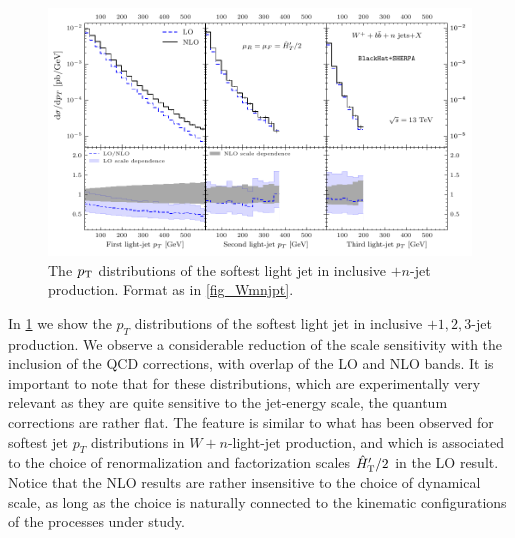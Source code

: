 \begin{figure}[ht]
  \centering
  \includegraphics[clip,scale=1]{plots/softestpt}
  \caption{The $p_{\textrm T}$
    distributions of the softest light jet in inclusive \Wbbp$+n$-jet production.
    Format as in \cref{fig_Wmnjpt}.}
    \label{fig_Wmnjptlight}
  \end{figure}

In \cref{fig_Wmnjptlight} we show the $p_T$ distributions of the softest light jet in
inclusive \Wbbp{}$+1,2,3$-jet production. We observe a considerable reduction of the scale
sensitivity with the inclusion of the QCD corrections, with overlap of the LO
and NLO bands. It is important to note that for these distributions, which are
experimentally very relevant as they are quite sensitive to the jet-energy
scale, the quantum corrections are rather flat. The feature is similar to
what has been observed for softest jet $p_T$ distributions in $W+n$-light-jet
production, and which is associated to the choice of renormalization and
factorization scales ${\hat H}_{\mathrm T}'/2$ in the LO result. Notice that the NLO
results are rather insensitive to the choice of dynamical scale, as long as the
choice is naturally connected to the kinematic configurations of the processes
under study.

